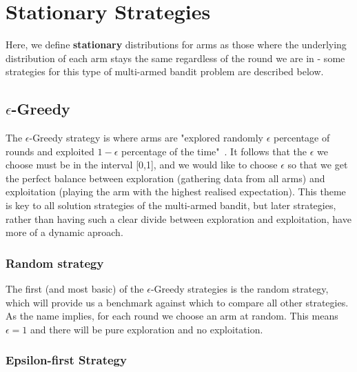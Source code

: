 \section{Stationary Strategies}\label{sec:stationary-strategies}
Here, we define \textbf{stationary} distributions for arms as those where the underlying distribution of each arm stays the same regardless of the round we are in - some strategies for this type of multi-armed bandit problem are described below.

\subsection{$\epsilon$-Greedy}\label{subsec: $epsilon$-greedy}
The $\epsilon$-Greedy strategy is where arms are "explored randomly $\epsilon$ percentage of rounds and exploited $1-\epsilon$ percentage of the time"~\citep{DBLP:journals/corr/abs-1807-09809}.
It follows that the $\epsilon$ we choose must be in the interval [0,1], and we would like to choose $\epsilon$ so that we get the perfect balance between exploration (gathering data from all arms) and exploitation (playing the arm with the highest realised expectation).
This theme is key to all solution strategies of the multi-armed bandit, but later strategies, rather than having such a clear divide between exploration and exploitation, have more of a dynamic aproach.

\subsubsection{Random strategy}
The first (and most basic) of the $\epsilon$-Greedy strategies is the random strategy, which will provide us a benchmark against which to compare all other strategies.
As the name implies, for each round we choose an arm at random.
This means $\epsilon=1$ and there will be pure exploration and no exploitation.

\subsubsection{Epsilon-first Strategy}

